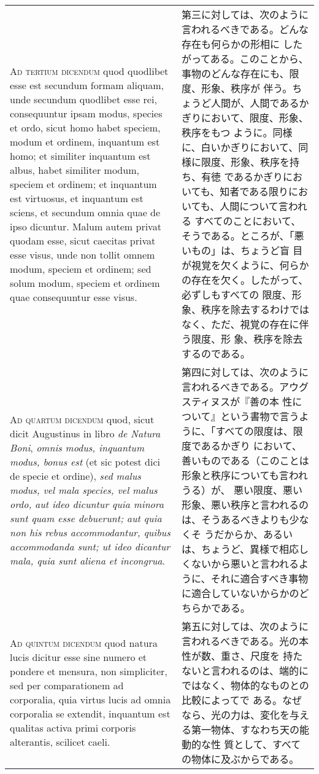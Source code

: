 \documentclass[10pt]{jsarticle}
\begin{document}
\begin{longtable}{p{21em}p{21em}}
\\

{\scshape Ad tertium dicendum} quod quodlibet esse est secundum formam
 aliquam, unde secundum quodlibet esse rei, consequuntur ipsam modus,
 species et ordo, sicut homo habet speciem, modum et ordinem, inquantum
 est homo; et similiter inquantum est albus, habet similiter modum,
 speciem et ordinem; et inquantum est virtuosus, et inquantum est
 sciens, et secundum omnia quae de ipso dicuntur. Malum autem privat
 quodam esse, sicut caecitas privat esse visus, unde non tollit omnem
 modum, speciem et ordinem; sed solum modum, speciem et ordinem quae
 consequuntur esse visus.

&


第三に対しては、次のように言われるべきである。どんな存在も何らかの形相に
 したがってある。このことから、事物のどんな存在にも、限度、形象、秩序が
 伴う。ちょうど人間が、人間であるかぎりにおいて、限度、形象、秩序をもつ
 ように。同様に、白いかぎりにおいて、同様に限度、形象、秩序を持ち、有徳
 であるかぎりにおいても、知者である限りにおいても、人間について言われる
 すべてのことにおいて、そうである。ところが、「悪いもの」は、ちょうど盲
 目が視覚を欠くように、何らかの存在を欠く。したがって、必ずしもすべての
 限度、形象、秩序を除去するわけではなく、ただ、視覚の存在に伴う限度、形
 象、秩序を除去するのである。

\\

{\scshape Ad quartum dicendum} quod, sicut dicit Augustinus in libro
 {\itshape de Natura Boni}, {\itshape omnis modus, inquantum modus,
 bonus est} (et sic potest dici de specie et ordine), {\itshape sed
 malus modus, vel mala species, vel malus ordo, aut ideo dicuntur quia
 minora sunt quam esse debuerunt; aut quia non his rebus accommodantur,
 quibus accommodanda sunt; ut ideo dicantur mala, quia sunt aliena et
 incongrua}.

&

第四に対しては、次のように言われるべきである。アウグスティヌスが『善の本
 性について』という書物で言うように、「すべての限度は、限度であるかぎり
 において、善いものである（このことは形象と秩序についても言われうる）が、
 悪い限度、悪い形象、悪い秩序と言われるのは、そうあるべきよりも少なくそ
 うだからか、あるいは、ちょうど、異様で相応しくないから悪いと言われるよ
 うに、それに適合すべき事物に適合していないからかのどちらかである。


\\

{\scshape Ad quintum dicendum} quod natura lucis dicitur esse sine numero et
 pondere et mensura, non simpliciter, sed per comparationem ad
 corporalia, quia virtus lucis ad omnia corporalia se extendit,
 inquantum est qualitas activa primi corporis alterantis, scilicet
 caeli.

&


第五に対しては、次のように言われるべきである。光の本性が数、重さ、尺度を
 持たないと言われるのは、端的にではなく、物体的なものとの比較によってで
 ある。なぜなら、光の力は、変化を与える第一物体、すなわち天の能動的な性
 質として、すべての物体に及ぶからである。



\end{longtable}
\end{document}
